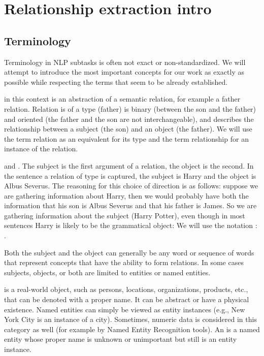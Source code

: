 \chapter{Relationship extraction intro} 

\section{Terminology}
Terminology in NLP subtasks is often not exact or non-standardized. We will attempt to introduce the most important concepts for our work as exactly as possible while respecting the terms that seem to be already established. 


 in this context is an abstraction of a semantic relation, for example a father relation. Relation is of a type (father) is binary (between the son and the father) and oriented (the father and the son are not interchangeable), and describes the relationship between a subject (the son) and an object (the father). We will use the term relation as an equivalent for its type and the term relationship for an instance of the relation. 


 and . The subject is the first argument of a relation, the object is the second. In the sentence  a relation of type is captured, the subject is Harry and the object is Albus Severus. The reasoning for this choice of direction is as follows: suppose we are gathering information about Harry, then we would probably have both the information that his son is Albus Severus and that his father is James. So we are gathering information about the subject (Harry Potter), even though in most sentences Harry is likely to be the grammatical object:  We will use the notation : . 

Both the subject and the object can generally be any word or sequence of words that represent concepts that have the ability to form relations. In some cases subjects, objects, or both are limited to entities or named entities.

   is a real-world object, such as persons, locations, organizations, products, etc., that can be denoted with a proper name. It can be abstract or have a physical existence. Named entities can simply be viewed as entity instances (e.g., New York City is an instance of a city). Sometimes, numeric data is considered in this category as well (for example by Named Entity Recognition tools). An  is a named entity whose proper name is unknown or unimportant but still is an entity instance. 

